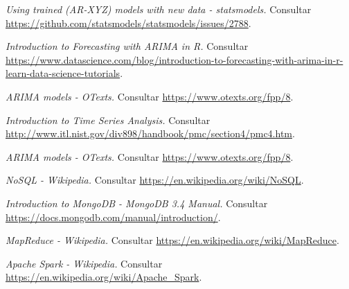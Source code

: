 \documentclass[11pt,spanish,listoffigures,listoftables]{tfgetsinf}
\begin{document}
\begin{thebibliography}{10}
   \textit{Using trained (AR-XYZ) models with new data - statsmodels.}
   \newblock Consultar 
   \url{https://github.com/statsmodels/statsmodels/issues/2788}.

   \textit{Introduction to Forecasting with ARIMA in R.}
   \newblock Consultar 
   \url{https://www.datascience.com/blog/introduction-to-forecasting-with-arima-in-r-learn-data-science-tutorials}.

   \textit{ARIMA models - OTexts.}
   \newblock Consultar 
   \url{https://www.otexts.org/fpp/8}.

   \textit{Introduction to Time Series Analysis.}
   \newblock Consultar 
   \url{http://www.itl.nist.gov/div898/handbook/pmc/section4/pmc4.htm}.

   \textit{ARIMA models - OTexts.}
   \newblock Consultar 
   \url{https://www.otexts.org/fpp/8}.
   
   \textit{NoSQL - Wikipedia.}
   \newblock Consultar 
   \url{https://en.wikipedia.org/wiki/NoSQL}.
   
   \textit{Introduction to MongoDB - MongoDB 3.4 Manual.}
   \newblock Consultar 
   \url{https://docs.mongodb.com/manual/introduction/}.
   
   \textit{MapReduce - Wikipedia.}
   \newblock Consultar 
   \url{https://en.wikipedia.org/wiki/MapReduce}.

   \textit{Apache Spark - Wikipedia.}
   \newblock Consultar 
   \url{https://en.wikipedia.org/wiki/Apache_Spark}.

\end{thebibliography}
\cleardoublepage

%
\end{document}
